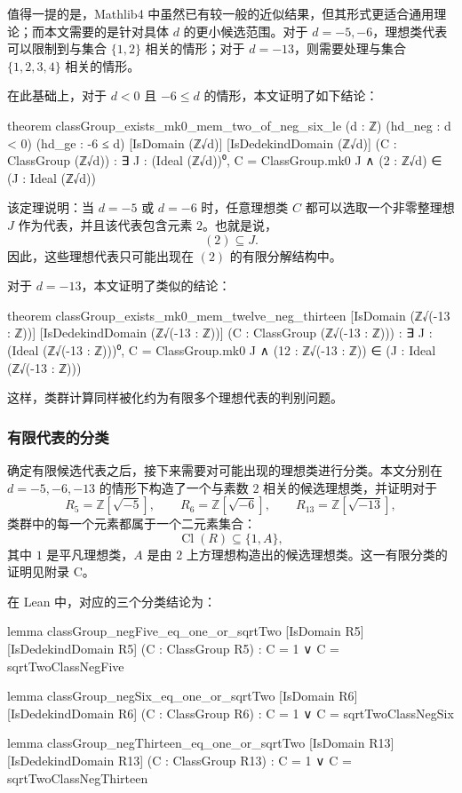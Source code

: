 值得一提的是，Mathlib4 中虽然已有较一般的近似结果，但其形式更适合通用理论；而本文需要的是针对具体 \(d\) 的更小候选范围。对于 \(d=-5,-6\)，理想类代表可以限制到与集合 \(\{1,2\}\) 相关的情形；对于 \(d=-13\)，则需要处理与集合 \(\{1,2,3,4\}\) 相关的情形。

在此基础上，对于 \(d<0\) 且 \(-6\le d\) 的情形，本文证明了如下结论：
\begin{leanlisting}
theorem classGroup_exists_mk0_mem_two_of_neg_six_le
    (d : ℤ) (hd_neg : d < 0) (hd_ge : -6 ≤ d)
    [IsDomain (ℤ√d)] [IsDedekindDomain (ℤ√d)] (C : ClassGroup (ℤ√d)) :
    ∃ J : (Ideal (ℤ√d))⁰,
      C = ClassGroup.mk0 J ∧ (2 : ℤ√d) ∈ (J : Ideal (ℤ√d))
\end{leanlisting}

该定理说明：当 \(d=-5\) 或 \(d=-6\) 时，任意理想类 \(C\) 都可以选取一个非零整理想 \(J\) 作为代表，并且该代表包含元素 \(2\)。也就是说，
\[
(2)\subseteq J.
\]
因此，这些理想代表只可能出现在 \((2)\) 的有限分解结构中。

对于 \(d=-13\)，本文证明了类似的结论：
\begin{leanlisting}
theorem classGroup_exists_mk0_mem_twelve_neg_thirteen
    [IsDomain (ℤ√(-13 : ℤ))] [IsDedekindDomain (ℤ√(-13 : ℤ))]
    (C : ClassGroup (ℤ√(-13 : ℤ))) :
    ∃ J : (Ideal (ℤ√(-13 : ℤ)))⁰,
      C = ClassGroup.mk0 J ∧ (12 : ℤ√(-13 : ℤ)) ∈ (J : Ideal (ℤ√(-13 : ℤ)))
\end{leanlisting}

这样，类群计算同样被化约为有限多个理想代表的判别问题。

\subsubsection{有限代表的分类}

确定有限候选代表之后，接下来需要对可能出现的理想类进行分类。本文分别在 \(d=-5,-6,-13\) 的情形下构造了一个与素数 \(2\) 相关的候选理想类，并证明对于
\[
R_5=\mathbb Z[\sqrt{-5}],\qquad
R_6=\mathbb Z[\sqrt{-6}],\qquad
R_{13}=\mathbb Z[\sqrt{-13}],
\]
类群中的每一个元素都属于一个二元素集合：
\[
\operatorname{Cl}(R)\subseteq\{1,A\},
\]
其中 \(1\) 是平凡理想类，\(A\) 是由 \(2\) 上方理想构造出的候选理想类。这一有限分类的证明见附录 C。

在 Lean 中，对应的三个分类结论为：
\begin{leanlisting}
lemma classGroup_negFive_eq_one_or_sqrtTwo
    [IsDomain R5] [IsDedekindDomain R5] (C : ClassGroup R5) :
    C = 1 ∨ C = sqrtTwoClassNegFive

lemma classGroup_negSix_eq_one_or_sqrtTwo
    [IsDomain R6] [IsDedekindDomain R6] (C : ClassGroup R6) :
    C = 1 ∨ C = sqrtTwoClassNegSix

lemma classGroup_negThirteen_eq_one_or_sqrtTwo
    [IsDomain R13] [IsDedekindDomain R13] (C : ClassGroup R13) :
    C = 1 ∨ C = sqrtTwoClassNegThirteen
\end{leanlisting}

